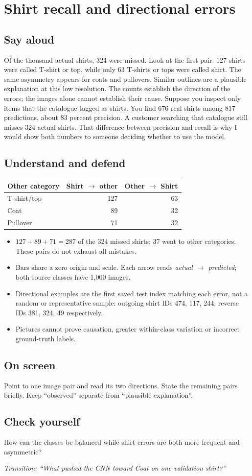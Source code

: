 \documentclass[11pt,a4paper]{article}
\newcommand{\slide}[3]{\clearpage{\small\color{olive}SLIDE #1\hfill Target: #3}\par\section{#2}}
\newcommand{\say}{\subsection{Say aloud}}
\newcommand{\understand}{\subsection{Understand and defend}}
\newcommand{\screen}{\subsection{On screen}}
\newcommand{\selfcheck}[1]{\subsection{Check yourself}#1}
\newcommand{\transition}[1]{\par\smallskip\textit{Transition: #1}}
\begin{document}
\slide{13}{Shirt recall and directional errors}{50 seconds}
\say
Of the thousand actual shirts, 324 were missed. Look at the first pair: 127 shirts were called T-shirt or top, while only 63 T-shirts or tops were called shirt. The same asymmetry appears for coats and pullovers. Similar outlines are a plausible explanation at this low resolution. The counts establish the direction of the errors; the images alone cannot establish their cause. Suppose you inspect only items that the catalogue tagged as shirts. You find 676 real shirts among 817 predictions, about 83 percent precision. A customer searching that catalogue still misses 324 actual shirts. That difference between precision and recall is why I would show both numbers to someone deciding whether to use the model.
\understand
\begin{tabularx}{\linewidth}{Xrr}
\toprule Other category & Shirt $\to$ other & Other $\to$ Shirt\\\midrule
T-shirt/top & 127 & 63\\
Coat & 89 & 32\\
Pullover & 71 & 32\\\bottomrule
\end{tabularx}
\begin{itemize}
\item $127+89+71=287$ of the 324 missed shirts; 37 went to other categories. These pairs do not exhaust all mistakes.
\item Bars share a zero origin and scale. Each arrow reads \emph{actual $\to$ predicted}; both source classes have 1,000 images.
\item Directional examples are the first saved test index matching each error, not a random or representative sample: outgoing shirt IDs 474, 117, 244; reverse IDs 381, 324, 49 respectively.
\item Pictures cannot prove causation, greater within-class variation or incorrect ground-truth labels.
\end{itemize}
\screen
Point to one image pair and read its two directions. State the remaining pairs briefly. Keep ``observed'' separate from ``plausible explanation''.
\selfcheck{How can the classes be balanced while shirt errors are both more frequent and asymmetric?}
\transition{``What pushed the CNN toward Coat on one validation shirt?''}
\end{document}
